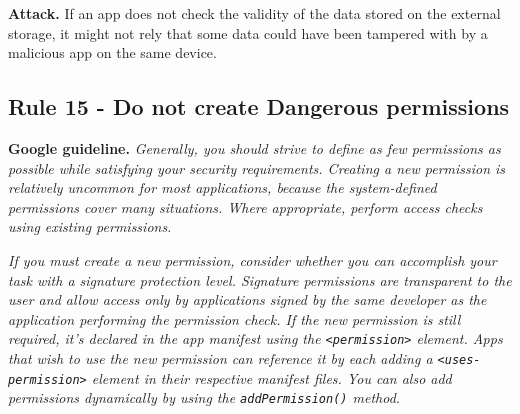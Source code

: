 \setcounter{algocf}{13}
\begin{algorithm}[]
\SetAlgoLined
{}
\caption{}
\label{algorithm14}
\end{algorithm}

\textbf{Attack.} If an app does not check the validity of the data stored on the external storage, it might not rely that some data could have been tampered with by a malicious app on the same device.

\subsection{Rule 15 - Do not create Dangerous permissions} 

\textbf{Google guideline.} \emph{Generally, you should strive to define as few permissions as possible while satisfying your security requirements. Creating a new permission is relatively uncommon for most applications, because the \textit{system-defined permissions} cover many situations. Where appropriate, perform access checks using existing permissions.}

\emph{If you must create a new permission, consider whether you can accomplish your task with a \textit{signature protection level}. Signature permissions are transparent to the user and allow access only by applications signed by the same developer as the application performing the permission check. If the new permission is still required, it's declared in the app manifest using the \texttt{<permission>} element. Apps that wish to use the new permission can reference it by each adding a \texttt{<uses-permission>} element in their respective manifest files. You can also add permissions dynamically by using the \texttt{addPermission()} method.}

